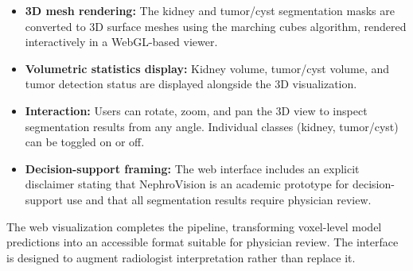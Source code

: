 \begin{itemize}
    \item \textbf{3D mesh rendering:} The kidney and tumor/cyst segmentation masks are converted to 3D surface meshes using the marching cubes algorithm, rendered interactively in a WebGL-based viewer.
    \item \textbf{Volumetric statistics display:} Kidney volume, tumor/cyst volume, and tumor detection status are displayed alongside the 3D visualization.
    \item \textbf{Interaction:} Users can rotate, zoom, and pan the 3D view to inspect segmentation results from any angle. Individual classes (kidney, tumor/cyst) can be toggled on or off.
    \item \textbf{Decision-support framing:} The web interface includes an explicit disclaimer stating that NephroVision is an academic prototype for decision-support use and that all segmentation results require physician review.
\end{itemize}

The web visualization completes the pipeline, transforming voxel-level model predictions into an accessible format suitable for physician review. The interface is designed to augment radiologist interpretation rather than replace it.
